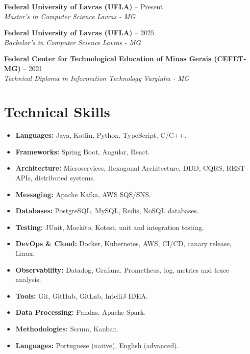 \documentclass[a4paper,10pt]{article}
\newcommand{\entry}[4]{
  \noindent\textbf{#1} \hfill #2 \\
  \noindent\textit{#3} \hfill \textit{#4} \\
  \vspace{2pt}
}
\begin{document}
\entry{Federal University of Lavras (UFLA)}{\faCalendar \space 2026 -- Present}{Master's in Computer Science}{\faMapMarker \space Lavras - MG}

\entry{Federal University of Lavras (UFLA)}{\faCalendar \space 2022 -- 2025}{Bachelor's in Computer Science}{\faMapMarker \space Lavras - MG}

\entry{Federal Center for Technological Education of Minas Gerais (CEFET-MG)}{\faCalendar \space 2019 -- 2021}{Technical Diploma in Information Technology}{\faMapMarker \space Varginha - MG}

\section*{Technical Skills}
\vspace{0.6em}
\begin{itemize}
\setlength\itemsep{0em}
\item \textbf{Languages:} Java, Kotlin, Python, TypeScript, C/C++.
\item \textbf{Frameworks:} Spring Boot, Angular, React.
\item \textbf{Architecture:} Microservices, Hexagonal Architecture, DDD, CQRS, REST APIs, distributed systems.
\item \textbf{Messaging:} Apache Kafka, AWS SQS/SNS.
\item \textbf{Databases:} PostgreSQL, MySQL, Redis, NoSQL databases.
\item \textbf{Testing:} JUnit, Mockito, Kotest, unit and integration testing.
\item \textbf{DevOps \& Cloud:} Docker, Kubernetes, AWS, CI/CD, canary release, Linux.
\item \textbf{Observability:} Datadog, Grafana, Prometheus, log, metrics and trace analysis.
\item \textbf{Tools:} Git, GitHub, GitLab, IntelliJ IDEA.
\item \textbf{Data Processing:} Pandas, Apache Spark.
\item \textbf{Methodologies:} Scrum, Kanban.
\item \textbf{Languages:} Portuguese (native), English (advanced).
\end{itemize}
\end{document}
